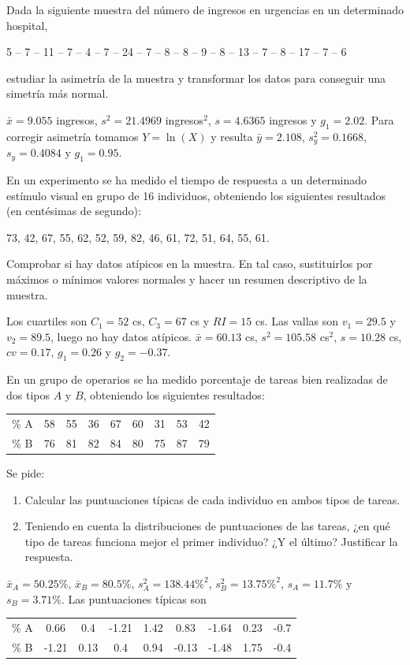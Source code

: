 {Dada la siguiente muestra del número de ingresos en urgencias en un determinado hospital,
\begin{center}
5 -- 7 -- 11 -- 7 -- 4 -- 7 -- 24 -- 7 -- 8 -- 8 -- 9 -- 8 -- 13 -- 7 -- 8 -- 17 -- 7 -- 6
\end{center}
estudiar la asimetría de la muestra y transformar los datos para conseguir una simetría más normal.
}
{$\bar x=9.055$ ingresos, $s^2=21.4969$ ingresos$^2$, $s=4.6365$ ingresos y $g_1=2.02$.
Para corregir asimetría tomamos $Y=\ln(X)$ y resulta $\bar y= 2.108$, $s_y^2=0.1668$, $s_y=0.4084$ y $g_1=0.95$.
}
{}


{En un experimento se ha medido el tiempo de respuesta a un determinado estímulo visual en grupo de 16 individuos, obteniendo los siguientes resultados (en centésimas de segundo):
\begin{center}
73, 42, 67, 55, 62, 52, 59, 82, 46, 61, 72, 51, 64, 55, 61.
\end{center}
Comprobar si hay datos atípicos en la muestra. En tal caso, sustituirlos por máximos o mínimos valores normales y hacer un resumen descriptivo de la muestra.
}
{Los cuartiles son $C_1=52$ cs, $C_3=67$ cs y $RI=15$ cs. Las vallas son $v_1=29.5$ y $v_2=89.5$, luego no hay datos atípicos. $\bar x=60.13$ cs, $s^2=105.58$ cs$^2$, $s=10.28$ cs, $cv=0.17$, $g_1=0.26$ y $g_2=-0.37$.
}
{}


{En un grupo de operarios se ha medido porcentaje de tareas bien realizadas de dos tipos $A$ y $B$, obteniendo los siguientes resultados:
\begin{center}
\begin{tabular}{ccccccccc}
\% A & 58 & 55 & 36 & 67 & 60 & 31 & 53 & 42\\
\% B & 76 & 81 & 82 & 84 & 80 & 75 & 87 & 79\\
\end{tabular}
\end{center}
Se pide:
\begin{enumerate}
\item Calcular las puntuaciones típicas de cada individuo en ambos tipos de tareas.
\item Teniendo en cuenta la distribuciones de puntuaciones de las tareas, ¿en qué tipo de tareas funciona mejor el primer individuo? ¿Y el último? Justificar la respuesta. 
\end{enumerate}
}
{$\bar{x}_A=50.25\%$, $\bar{x}_B=80.5\%$, $s_A^2=138.44\%^2$, $s_B^2=13.75\%^2$, $s_A=11.7\%$ y $s_B=3.71\%$. Las puntuaciones típicas son
\begin{center}
\begin{tabular}{ccccccccc}
\% A & 0.66 & 0.4 & -1.21 & 1.42 & 0.83 & -1.64 & 0.23 & -0.7\\
\% B & -1.21 & 0.13 & 0.4 & 0.94 & -0.13 & -1.48 & 1.75 & -0.4\\
\end{tabular}
\end{center} 
}
{}


